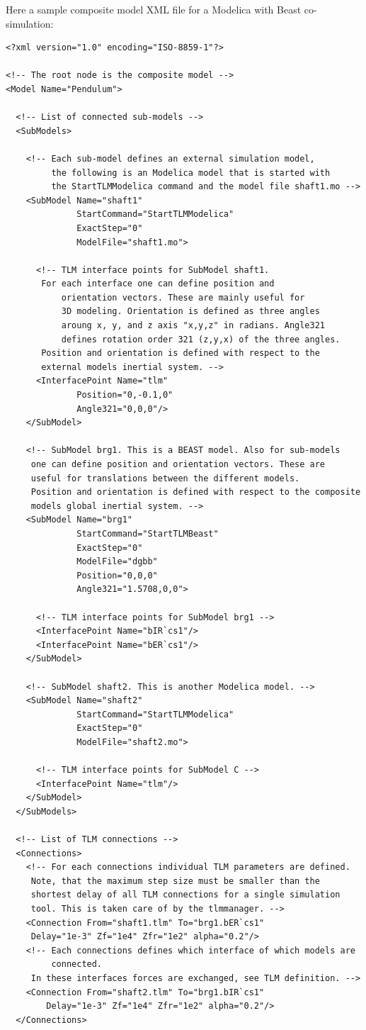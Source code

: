 Here a sample composite model XML file for a Modelica with Beast co-simulation:
{\scriptsize
\begin{verbatim}
<?xml version="1.0" encoding="ISO-8859-1"?>

<!-- The root node is the composite model -->
<Model Name="Pendulum">

  <!-- List of connected sub-models -->
  <SubModels>	
    
    <!-- Each sub-model defines an external simulation model, 
         the following is an Modelica model that is started with
         the StartTLMModelica command and the model file shaft1.mo -->
    <SubModel Name="shaft1"
              StartCommand="StartTLMModelica" 
              ExactStep="0"
              ModelFile="shaft1.mo">
      
      <!-- TLM interface points for SubModel shaft1. 
	   For each interface one can define position and 
           orientation vectors. These are mainly useful for
           3D modeling. Orientation is defined as three angles
           aroung x, y, and z axis "x,y,z" in radians. Angle321
           defines rotation order 321 (z,y,x) of the three angles. 
	   Position and orientation is defined with respect to the 
	   external models inertial system. -->
      <InterfacePoint Name="tlm"
		      Position="0,-0.1,0"
		      Angle321="0,0,0"/>
    </SubModel>
    
    <!-- SubModel brg1. This is a BEAST model. Also for sub-models
	 one can define position and orientation vectors. These are
	 useful for translations between the different models.
	 Position and orientation is defined with respect to the composite
	 models global inertial system. -->
    <SubModel Name="brg1" 
              StartCommand="StartTLMBeast" 
              ExactStep="0"
              ModelFile="dgbb"
              Position="0,0,0"
              Angle321="1.5708,0,0">
      
      <!-- TLM interface points for SubModel brg1 -->
      <InterfacePoint Name="bIR`cs1"/>
      <InterfacePoint Name="bER`cs1"/>
    </SubModel>
    
    <!-- SubModel shaft2. This is another Modelica model. -->
    <SubModel Name="shaft2" 
              StartCommand="StartTLMModelica" 
              ExactStep="0"
              ModelFile="shaft2.mo">
      
      <!-- TLM interface points for SubModel C -->
      <InterfacePoint Name="tlm"/>
    </SubModel>    
  </SubModels>

  <!-- List of TLM connections -->
  <Connections>
    <!-- For each connections individual TLM parameters are defined.
	 Note, that the maximum step size must be smaller than the
	 shortest delay of all TLM connections for a single simulation
	 tool. This is taken care of by the tlmmanager. --> 
    <Connection From="shaft1.tlm" To="brg1.bER`cs1"
	 Delay="1e-3" Zf="1e4" Zfr="1e2" alpha="0.2"/>
    <!-- Each connections defines which interface of which models are 
         connected.
	 In these interfaces forces are exchanged, see TLM definition. -->
    <Connection From="shaft2.tlm" To="brg1.bIR`cs1" 
		Delay="1e-3" Zf="1e4" Zfr="1e2" alpha="0.2"/>
  </Connections>
  

\end{verbatim}}

